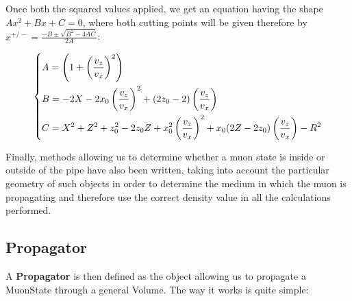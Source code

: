 \documentclass[a4paper, 11pt]{report}
\begin{document}
Once both the squared values applied, we get an equation having the shape $Ax^2 + Bx + C = 0$, where both cutting points will be given therefore by $x^{+/-} = \frac{-B \pm \sqrt{B^2 - 4 AC}}{2A}$:

\begin{equation}
\label{eq:lines}
\begin{dcases}
A = \left (1 + \left (\frac{v_z}{v_x} \right )^2 \right ) \\
B = -2X - 2 x_0 \left (\frac{v_z}{v_x} \right )^2 + (2 z_0 - 2) \left (\frac{v_z}{v_x} \right ) \\
C = X^2 + Z^2 + z_0^2 - 2 z_0 Z + x_0^2 \left (\frac{v_z}{v_x} \right )^2 + x_0 (2 Z - 2 z_0) \left (\frac{v_z}{v_x} \right ) - R^2
\end{dcases}
\end{equation}

Finally, methods allowing us to determine whether a muon state is inside or outside of the pipe have also been written, taking into account the particular geometry of such objects in order to determine the medium in which the muon is propagating and therefore use the correct density value in all the calculations performed. 

\subsection{Propagator}

A \textbf{Propagator} is then defined as the object allowing us to propagate a MuonState through a general Volume. The way it works is quite simple: 
\end{document}
